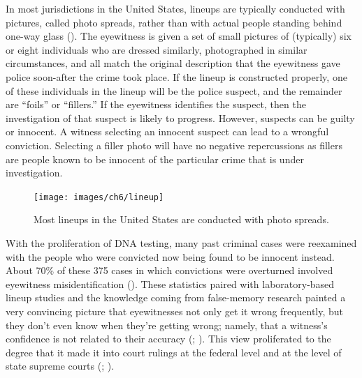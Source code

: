 \documentclass[
]{krantz}
\begin{document}
In most jurisdictions in the United States, lineups are typically conducted with pictures, called photo spreads, rather than with actual people standing behind one-way glass (). The eyewitness is given a set of small pictures of (typically) six or eight individuals who are dressed similarly, photographed in similar circumstances, and all match the original description that the eyewitness gave police soon-after the crime took place. If the lineup is constructed properly, one of these individuals in the lineup will be the police suspect, and the remainder are ``foils'' or ``fillers.'' If the eyewitness identifies the suspect, then the investigation of that suspect is likely to progress. However, suspects can be guilty or innocent. A witness selecting an innocent suspect can lead to a wrongful conviction. Selecting a filler photo will have no negative repercussions as fillers are people known to be innocent of the particular crime that is under investigation.

\begin{figure}

{\centering \texttt{[image: images/ch6/lineup]} 

}

\caption{Most lineups in the United States are conducted with photo spreads.}\label{fig:lineup}
\end{figure}

With the proliferation of DNA testing, many past criminal cases were reexamined with the people who were convicted now being found to be innocent instead. About 70\% of these 375 cases in which convictions were overturned involved eyewitness misidentification (). These statistics paired with laboratory-based lineup studies and the knowledge coming from false-memory research painted a very convincing picture that eyewitnesses not only get it wrong frequently, but they don't even know when they're getting wrong; namely, that a witness's confidence is not related to their accuracy (; ). This view proliferated to the degree that it made it into court rulings at the federal level and at the level of state supreme courts (; ).
\end{document}
